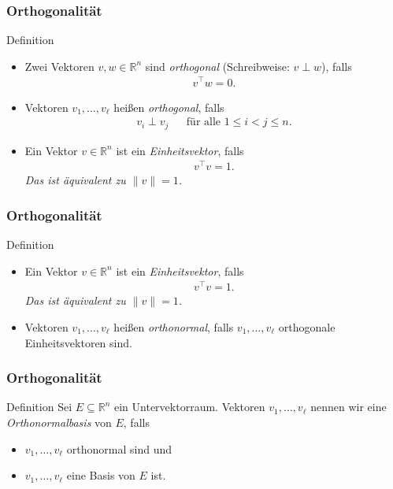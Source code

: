 \documentclass{beamer}
\title[Linadi]{\mytitle}
\author[Amin Coja-Oghlan]{Amin Coja-Oghlan}
\institute[Frankfurt]{JWGUFFM}
\date{}
\renewcommand{\emph}[1]{{\textcolor{solarizedRed}{\itshape #1}}}
\newcommand\RR{\mathbb R}
\newcommand{\trans}{\top}
\renewcommand{\ae}{\"a}
\newcommand{\ue}{\"u}
\newcommand{\mytitle}{Orthogonalit\ae t}
\begin{document}
\frame[plain]{\titlepage}

\begin{frame}\frametitle{\mytitle}
	\begin{block}{Definition}
		\begin{itemize}
			\item Zwei Vektoren $v,w\in\RR^n$ sind \emph{orthogonal} (Schreibweise: $v\perp w$), falls
				\begin{align*}
				v^\trans w=0.
				\end{align*}
			\item Vektoren $v_1,\ldots,v_\ell$ hei\ss en \emph{orthogonal}, falls
				\begin{align*}
					v_i\perp v_j&&\mbox{f\ue r alle }1\leq i<j\leq n.
				\end{align*}
			\item Ein Vektor $v\in\RR^n$ ist ein \emph{Einheitsvektor}, falls
				\begin{align*}
				v^\trans v=1.
				\end{align*}
				{\itshape Das ist \ae quivalent zu $\|v\|=1$.}
		\end{itemize}
	\end{block}
\end{frame}

\begin{frame}\frametitle{\mytitle}
	\begin{block}{Definition}
		\begin{itemize}
			\item Ein Vektor $v\in\RR^n$ ist ein \emph{Einheitsvektor}, falls
				\begin{align*}
				v^\trans v=1.
				\end{align*}
				{\itshape Das ist \ae quivalent zu $\|v\|=1$.}
			\item Vektoren $v_1,\ldots,v_\ell$ hei\ss en \emph{orthonormal}, falls $v_1,\ldots,v_\ell$ orthogonale Einheitsvektoren sind.
		\end{itemize}
	\end{block}
\end{frame}

\begin{frame}\frametitle{\mytitle}
	\begin{block}{Definition}
		Sei $E\subseteq\RR^n$ ein Untervektorraum.
Vektoren $v_1,\ldots,v_\ell$ nennen wir eine \emph{Orthonormalbasis} von $E$, falls
		\begin{itemize}
			\item $v_1,\ldots,v_\ell$ orthonormal sind und
			\item $v_1,\ldots,v_\ell$ eine Basis von $E$ ist.
		\end{itemize}
	\end{block}
\end{frame}
\end{document}

